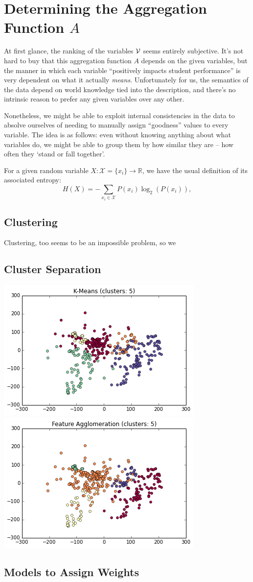 \documentclass[paper.tex]{subfiles}
\begin{document}
	\section{Determining the Aggregation Function $A$}
	
	At first glance, the ranking of the variables $\mathcal{V}$ seems entirely subjective. It's not hard to buy that this aggregation function $A$ depends on the given variables, but the manner in which each variable ``positively impacts student performance'' is very dependent on what it actually \emph{means}. Unfortunately for us, the semantics of the data depend on world knowledge tied into the description, and there's no intrinsic reason to prefer any given variables over any other.
	
	Nonetheless, we might be able to exploit internal consistencies in the data to absolve ourselves of needing to manually assign ``goodness'' values to every variable. The idea is as follows: even without knowing anything about what variables do, we might be able to group them by how similar they are -- how often they `stand or fall together'. 
	
	For a given random variable $X : \mathcal{X} = \{x_i\} \to \mathbb{R}$, we have the usual definition of its associated entropy:
	\begin{equation}
		H(X) = - \sum_{x_i \in \mathcal{X}} {P(x_i) \log_2 (P(x_i))},
	\end{equation}
	
	\subsection{Clustering}
	Clustering, too seems to be an impossible problem, so we 
	
	\subsection{Cluster Separation}
	
	\includegraphics[width=0.5\linewidth]{images/clusters_km_5.png}
	\includegraphics[width=0.5\linewidth]{images/clusters_fa_5.png}
		
	\subsection{Models to Assign Weights}
	
\end{document}
